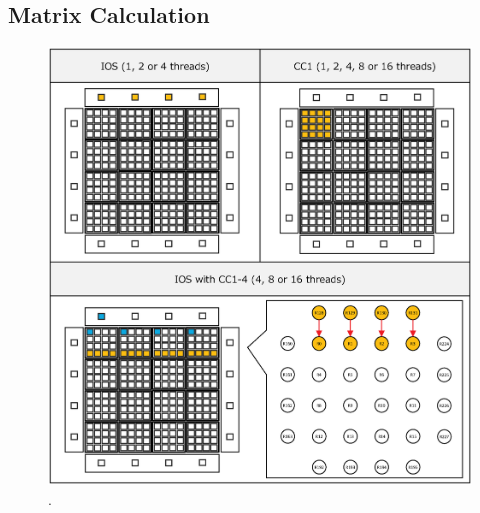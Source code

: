 \documentclass{sig-alternate-05-2015}
\begin{document}
\subsection{Matrix Calculation}
\label{sec:dnoc_ecal}

\begin{figure}[t]
  \centering
  \includegraphics[width=1.0\linewidth]{../figure/matrix_calculation.eps}
  \caption{\label{fig:noc_routes}
    .}
\end{figure}
\end{document}
